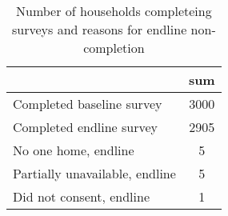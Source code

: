 \begin{table}[htbp]\centering
\def\sym#1{\ifmmode^{#1}\else\(^{#1}\)\fi}
\caption{Number of households completeing surveys and reasons for endline non-completion \label{tab:"label"}}
\begin{tabular*}{0.9\hsize}{@{\hskip\tabcolsep\extracolsep\fill}l*{1}{c}}
\toprule
                                &      sum\\
\midrule
Completed baseline survey       &     3000\\
Completed endline survey        &     2905\\
No one home, endline            &        5\\
Partially unavailable, endline  &        5\\
Did not consent, endline        &        1\\
\bottomrule
\end{tabular*}
\end{table}
